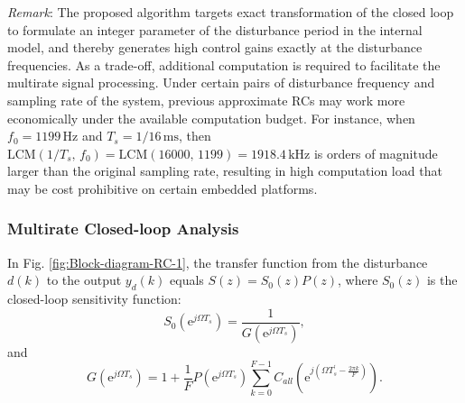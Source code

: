\documentclass [11pt, proquest] {uwthesis}[2020/02/24]
\begin{document}
\emph{Remark}: The proposed algorithm targets exact transformation
of the closed loop to formulate an integer parameter of the disturbance
period in the internal model, and thereby generates high control gains
exactly at the disturbance frequencies. As a trade-off, additional
computation is required to facilitate the multirate signal processing.
Under certain pairs of disturbance frequency and sampling rate of
the system, previous approximate RCs may work more economically under
the available computation budget. For instance, when $f_{0}=1199\,\text{Hz}$
and $T_{s}=1/16\,\text{ms}$, then $\text{LCM}(1/T_{s},\,f_{0})=\text{LCM}(16000,\,1199)=1918.4\,\text{kHz}$
is orders of magnitude larger than the original sampling rate, resulting
in high computation load that may be cost prohibitive on certain embedded
platforms.

\subsubsection{Multirate Closed-loop Analysis} \label{sssec:Multirate-closed-loop-analysis}

In Fig. \ref{fig:Block-diagram-RC-1}, the transfer function from
the disturbance $d(k)$ to the output $y_{d}(k)$ equals $S(z)=S_{0}(z)P(z)$,
where $S_{0}(z)$ is the closed-loop sensitivity function:
\begin{equation}
S_{0}(\text{e}^{j\Omega T_{s}})=\frac{1}{G(\text{e}^{j\Omega T_{s}})},\label{eq:S}
\end{equation}
\noindent and
\begin{equation}
G(\text{e}^{j\Omega T_{s}})=1+\frac{1}{F}P(\text{e}^{j\Omega T_{s}})\sum_{k=0}^{F-1}C_{all}(\text{e}^{j(\Omega T_{s}^{'}-\frac{2\pi k}{F})}).\label{eq:G}
\end{equation}
\end{document}
